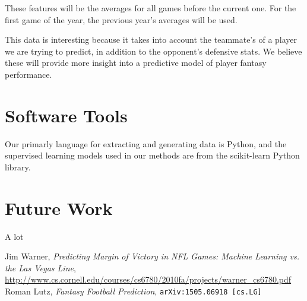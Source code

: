 \documentclass[11pt,a4paper]{article}
\begin{document}
These features will be the averages for all games before the current one. For the first game of the year, the previous year’s averages will be used.

This data is interesting because it takes into account the teammate’s of a player we are trying to predict, in addition to the opponent’s defensive stats. We believe these will provide more insight into a predictive model of player fantasy performance.

\section{Software Tools}
Our primarly language for extracting and generating data is Python, and the supervised learning models used in our methods are from the scikit-learn Python library. 

\section{Future Work}
A lot

\begin{thebibliography}{1}

  Jim Warner,
  \emph{Predicting Margin of Victory in NFL Games: Machine Learning vs. the Las Vegas Line},
  \url{http://www.cs.cornell.edu/courses/cs6780/2010fa/projects/warner_cs6780.pdf}
  Roman Lutz,
  \emph{Fantasy Football Prediction},
  {\tt arXiv:1505.06918 [cs.LG]}
\end{thebibliography}

\end{document}
